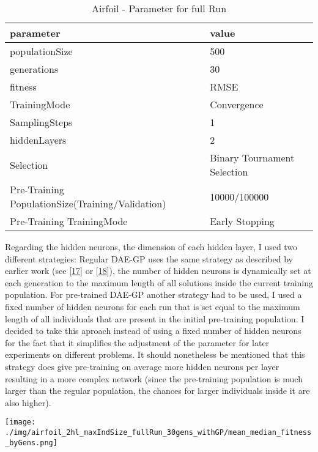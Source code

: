 \documentclass[
  11pt,
]{article}
\let\origfigure\figure
\let\endorigfigure\endfigure
\renewenvironment{figure}[1][2] {
    \expandafter\origfigure\expandafter[H]
} {
    \endorigfigure
}
\begin{document}
\begin{table}[!h]

\caption{\label{tab:airfoil_fullRun_2hl_maxIndSize_params}Airfoil - Parameter for full Run}
\centering
\begin{tabular}[t]{l|l}
\hline
\textbf{parameter} & \textbf{value}\\
\hline
populationSize & 500\\
\hline
generations & 30\\
\hline
fitness & RMSE\\
\hline
TrainingMode & Convergence\\
\hline
SamplingSteps & 1\\
\hline
hiddenLayers & 2\\
\hline
Selection & Binary Tournament Selection\\
\hline
Pre-Training PopulationSize(Training/Validation) & 10000/100000\\
\hline
Pre-Training TrainingMode & Early Stopping\\
\hline
\end{tabular}
\end{table}

Regarding the hidden neurons, the dimension of each hidden layer, I used
two different strategies: Regular DAE-GP uses the same strategy as
described by earlier work (see
{[}\protect\hyperlink{ref-dae-gp_2022_symreg}{17}{]} or
{[}\protect\hyperlink{ref-dae-gp_2020_rtree}{18}{]}), the number of
hidden neurons is dynamically set at each generation to the maximum
length of all solutions inside the current training population. For
pre-trained DAE-GP another strategy had to be used, I used a fixed
number of hidden neurons for each run that is set equal to the maximum
length of all individuals that are present in the initial pre-training
population. I decided to take this aproach instead of using a fixed
number of hidden neurons for the fact that it simplifies the adjustment
of the parameter for later experiments on different problems. It should
nonetheless be mentioned that this strategy does give pre-training on
average more hidden neurons per layer resulting in a more complex
network (since the pre-training population is much larger than the
regular population, the chances for larger individuals inside it are
also higher).

\begin{figure}
\centering
\texttt{[image: ./img/airfoil\_2hl\_maxIndSize\_fullRun\_30gens\_withGP/mean\_median\_fitness\_byGens.png]}
\caption{Best Fitness over 30 Generations - Airfoil}
\end{figure}
\end{document}
